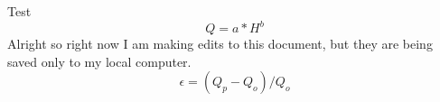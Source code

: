 \documentclass{article}
\title{}
\author{Luis Galindo}
\date{}
\begin{document}
\maketitle
Test
	\begin{equation}
	Q = a*H^b
	\end{equation}
Alright so right now I am making edits to this document, but they are being saved only to my local computer.
	\begin{equation}
	\epsilon = (Q_p-Q_o)/Q_o
	\end{equation}
\newpage


\end{document}
